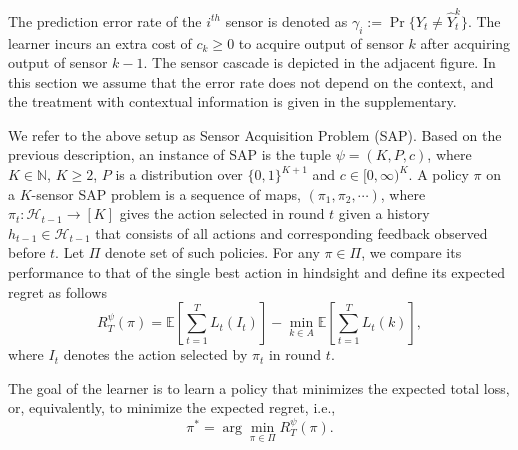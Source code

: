 The prediction error rate of the $i^{th}$ sensor is denoted as $\gamma_i:=\Pr\{Y_t\neq \hat{Y}^k_t\}$. The learner incurs an extra cost of $c_k\geq 0$ to acquire output of sensor $k$ after acquiring output of sensor $k-1$. The sensor cascade is depicted in the adjacent figure. In this section we assume that the error rate does not depend on the  context, and the treatment with contextual information is given in the supplementary. 
\fi

We refer to the above setup as Sensor Acquisition Problem (SAP).
Based on the previous description, an instance of SAP is the tuple $\psi = (K,P,c)$, where $K\in \mathbb{N}$, $K\ge 2$,
$P$ is a distribution over $\{0,1\}^{K+1}$ and $c\in [0,\infty)^K$. 
 A policy $\pi$ on a $K$-sensor SAP problem
 is a sequence of maps, $(\pi_1, \pi_2, \cdots)$, where
 $\pi_t : \mathcal{H}_{t-1}\rightarrow [K]$ gives the action selected in round $t$
 given a history $h_{t-1}\in \mathcal{H}_{t-1}$ that consists of all actions and corresponding feedback observed before $t$. 
 Let $\Pi$ denote set of such policies. 
 For any $\pi \in \Pi$, we compare its performance to that of the single best action in hindsight 
 and define its expected regret as follows
\begin{equation}
R^\psi_T(\pi)= \mathbb{E}\left[\sum_{t=1}^T L_t(I_t)\right]-\min_{k\in A}\mathbb{E}\left[\sum_{t=1}^T L_t(k)\right],
\end{equation}
where $I_t$ denotes the action selected by $\pi_t$ in round $t$.

The goal of the learner is to learn a policy that minimizes the expected total loss, or, equivalently, to minimize the expected regret, i.e.,
\begin{equation}
\pi^*= \arg \min_{\pi \in \Pi } R^\psi_T(\pi).
\end{equation}


